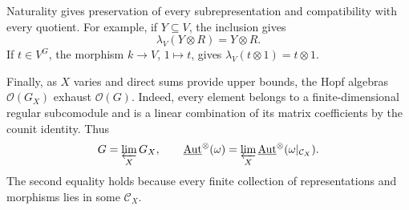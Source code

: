 Naturality gives preservation of every subrepresentation and compatibility with every quotient. For example, if $Y\subseteq V$, the inclusion gives
\[
 \lambda_V(Y\otimes R)=Y\otimes R.
\]
If $t\in V^G$, the morphism $k\to V$, $1\mapsto t$, gives $\lambda_V(t\otimes1)=t\otimes1$.

Finally, as $X$ varies and direct sums provide upper bounds, the Hopf algebras $\mathcal O(G_X)$ exhaust $\mathcal O(G)$. Indeed, every element belongs to a finite-dimensional regular subcomodule and is a linear combination of its matrix coefficients by the counit identity. Thus
\[
 G=\varprojlim_XG_X,\qquad
 \underline{\operatorname{Aut}}^{\otimes}(\omega)
 =\varprojlim_X\underline{\operatorname{Aut}}^{\otimes}(\omega|_{\mathcal C_X}).
\]
The second equality holds because every finite collection of representations and morphisms lies in some $\mathcal C_X$.
